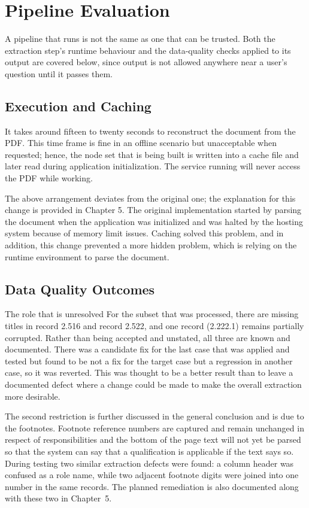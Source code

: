 \section{Pipeline Evaluation}

A pipeline that runs is not the same as one that can be trusted. Both the extraction step's
runtime behaviour and the data-quality checks applied to its output are covered below, since
output is not allowed anywhere near a user's question until it passes them.

\subsection{Execution and Caching}

It takes around fifteen to twenty seconds to reconstruct the document from the PDF. This time frame is fine in an offline scenario but unacceptable when requested; hence, the node set that is being built is written into a cache file and later read during application initialization. The service running will never access the PDF while working.

The above arrangement deviates from the original one; the explanation for this change is provided in Chapter 5. The original implementation started by parsing the document when the application was initialized and was halted by the hosting system because of memory limit issues. Caching solved this problem, and in addition, this change prevented a more hidden problem, which is relying on the runtime environment to parse the document.

\subsection{Data Quality Outcomes}

The role that is unresolved For the subset that was processed, there are missing titles in record 2.516 and record 2.522, and one record (2.222.1) remains partially corrupted. Rather than being accepted and unstated, all three are known and documented. There was a candidate fix for the last case that was applied and tested but found to be not a fix for the target case but a regression in another case, so it was reverted. This was thought to be a better result than to leave a documented defect where a change could be made to make the overall extraction more desirable.

The second restriction is further discussed in the general conclusion and is due to the footnotes. Footnote reference numbers are captured and remain unchanged in respect of responsibilities and the bottom of the page text will not yet be parsed so that the system can say that a qualification is applicable if the text says so. During testing two similar extraction defects were found: a column header was confused as a role name, while two adjacent footnote digits were joined into one number in the same records. The planned remediation is also documented along with these two in Chapter~5.

